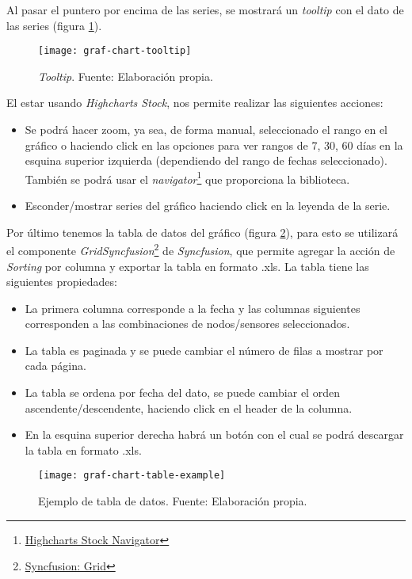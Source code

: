 Al pasar el puntero por encima de las series, se mostrará un \textit{tooltip} con el dato de las series (figura \ref{fig:graf-chart-tooltip}).
\begin{figure}[H]
	\centering
	\texttt{[image: graf-chart-tooltip]}
	\caption{\label{fig:graf-chart-tooltip} \textit{Tooltip}. Fuente: Elaboración propia.}
\end{figure}
El estar usando \textit{Highcharts Stock}, nos permite realizar las siguientes acciones:
\begin{itemize}
    \item Se podrá hacer zoom, ya sea, de forma manual, seleccionado el rango en el gráfico o haciendo click en las opciones para ver rangos de 7, 30, 60 días en la esquina superior izquierda (dependiendo del rango de fechas seleccionado). También se podrá usar el \textit{navigator}\footnote{\href{https://www.highcharts.com/docs/stock/navigator}{Highcharts Stock Navigator}} que proporciona la biblioteca.
    \item Esconder/mostrar series del gráfico haciendo click en la leyenda de la serie.
\end{itemize}

Por último tenemos la tabla de datos del gráfico (figura \ref{fig:graf-chart-table-example}), para esto se utilizará el componente \textit{Grid}\textit{Syncfusion}\footnote{\href{https://ej2.syncfusion.com/react/documentation/grid/getting-started}{Syncfusion: Grid}} de \textit{Syncfusion}, que permite agregar la acción de \textit{Sorting} por columna y exportar la tabla en formato .xls.
La tabla tiene las siguientes propiedades:
\begin{itemize}
    \item La primera columna corresponde a la fecha y las columnas siguientes corresponden a las combinaciones de nodos/sensores seleccionados.
    \item La tabla es paginada y se puede cambiar el número de filas a mostrar por cada página.
    \item La tabla se ordena por fecha del dato, se puede cambiar el orden ascendente/descendente, haciendo click en el header de la columna.
    \item En la esquina superior derecha habrá un botón con el cual se podrá descargar la tabla en formato .xls.
\end{itemize}

\begin{figure}[H]
	\centering
	\texttt{[image: graf-chart-table-example]}
	\caption{\label{fig:graf-chart-table-example} Ejemplo de tabla de datos. Fuente: Elaboración propia.}
\end{figure}\fi

